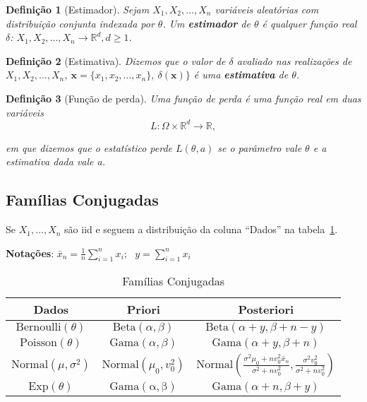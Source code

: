 \documentclass{article}
\newtheorem{definition}{Definição}
\begin{document}
\begin{definition}[Estimador]
Sejam $X_1, X_2, \ldots, X_n$ variáveis aleatórias com distribuição conjunta indexada por $\theta$. Um \textbf{estimador} de $\theta$ é qualquer função real $\delta$: $X_1, X_2, \ldots, X_n \rightarrow \mathbb{R}^d, d \geq 1$.
\end{definition}

\begin{definition}[Estimativa]
Dizemos que o valor de $\delta$ avaliado nas realizações de $X_1, X_2, \ldots, X_n$, $\textbf{x} = \{x_1, x_2, \ldots, x_n\}, \ \delta(\textbf{x})\}$ é uma \textbf{estimativa} de $\theta$.
\end{definition}

\begin{definition}[Função de perda]
Uma função de perda é uma função real em duas variáveis 
\begin{equation}
L: \Omega \times \mathbb{R}^d \rightarrow \mathbb{R},
\end{equation}

em que dizemos que o estatístico \textit{perde} $L(\theta, a)$ se o parâmetro vale $\theta$ e a estimativa dada vale a.
\end{definition}

\subsection*{Famílias Conjugadas}

Se $X_1,\ldots,X_n$ são iid e seguem a distribuição da coluna ``Dados'' na tabela~\ref{tab:1}.

\textbf{Notações}: $\bar {x}_n= \frac{1}{n}\sum_{i=1}^n x_i;~~~
y=\sum_{i=1}^nx_i$
\begin{table}[!htb]
    \centering
    \begin{tabular}{|c|c|c|}
        \hline \textbf{Dados} & \textbf{Priori} & \textbf{Posteriori}\\ \hline
         $\mathrm{Bernoulli}(\theta)$&$\mathrm{Beta}(\alpha,\beta)$ & $\mathrm{Beta}(\alpha+y,\beta+n-y)$ \\ \hline
         $\mathrm{Poisson}(\theta)$&$\mathrm{Gama}(\alpha,\beta)$&$\mathrm{Gama}(\alpha+y,\beta+n)$\\ \hline 
         $\mathrm{Normal}(\mu,\sigma^2)$ & $\mathrm{Normal}(\mu_0,v_0^2)$& $\mathrm{Normal}\left(\frac{\sigma^2\mu_0+nv_0^2\bar{x}_n}{\sigma^2+nv_0^2},\frac{\sigma^2v_0^2}{\sigma^2+nv_0^2}\right)$ \\ \hline
         $\mathrm{Exp}(\theta)$ &$\mathrm{Gama(\alpha,\beta)}$ & $\mathrm{Gama}(\alpha+n,\beta+y)$ \\ \hline

    \end{tabular}
    \caption{Famílias Conjugadas}\label{tab:1}
\end{table}
\end{document}
